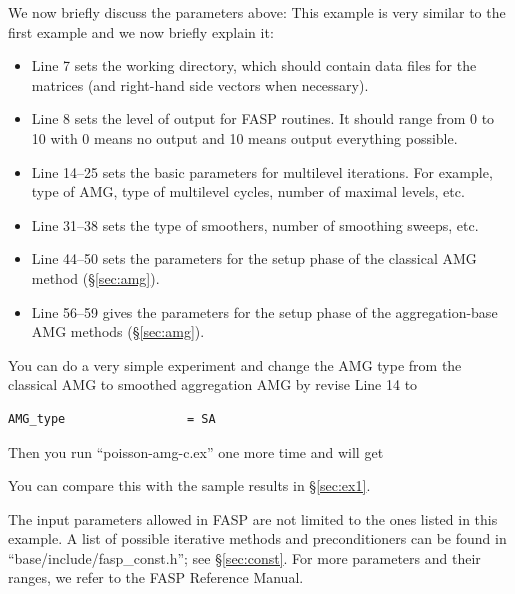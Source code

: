 \documentclass[11pt]{memoir}
\begin{document}
We now briefly discuss the parameters above:
%
This example is very similar to the first example and we now briefly explain it:
\begin{itemize}
%
\item Line 7 sets the working directory, which should contain data files for the matrices (and right-hand side vectors when necessary).
%
\item Line 8 sets the level of output for FASP routines. It should range from 0 to 10 with 0 means no output and 10 means output everything possible.
%
\item Line 14--25 sets the basic parameters for multilevel iterations. For example, type of AMG, type of multilevel cycles, number of maximal levels, etc.
%
\item Line 31--38 sets the type of smoothers, number of smoothing sweeps, etc.
%
\item Line 44--50 sets the parameters for the setup phase of the classical AMG method (\S\ref{sec:amg}).
%
\item Line 56--59 gives the parameters for the setup phase of the aggregation-base AMG methods (\S\ref{sec:amg}).
%
\end{itemize}
%

You can do a very simple experiment and change the AMG type from the classical AMG to smoothed aggregation AMG by revise Line 14 to
%
\begin{lstlisting}[numbers=none]
AMG_type                 = SA
\end{lstlisting}
%
Then you run ``poisson-amg-c.ex'' one more time and will get
%

%
You can compare this with the sample results in \S\ref{sec:ex1}.

\begin{snugshade}\noindent
The input parameters allowed in FASP are not limited to the ones listed in this example. A list of possible iterative methods and preconditioners can be found in ``base/include/fasp\_const.h''; see \S\ref{sec:const}. For more parameters and their ranges, we refer to the FASP Reference Manual.
\end{snugshade}
\end{document}
